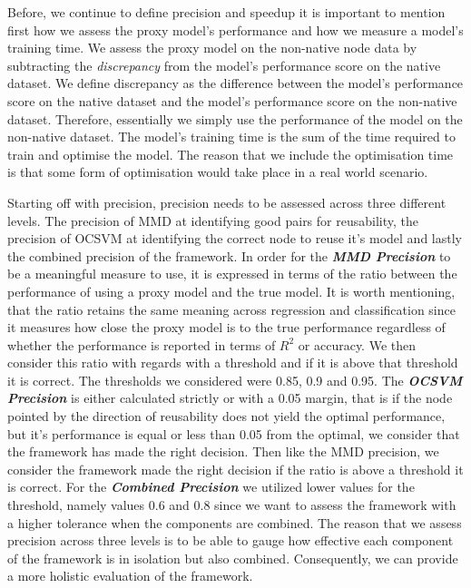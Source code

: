 \documentclass{mpaper}
\begin{document}
Before, we continue to define precision and speedup it is important to mention first how we assess the proxy model's performance and how we measure a model's training time. We assess the proxy model on the non-native node data by subtracting the \textit{discrepancy} from the model's performance score on the native dataset. We define discrepancy as the difference between the model's performance score on the native dataset and the model's performance score on the non-native dataset. Therefore, essentially we simply use the performance of the model on the non-native dataset. The model's training time is the sum of the time required to train and optimise the model. The reason that we include the optimisation time is that some form of optimisation would take place in a real world scenario.

Starting off with precision, precision needs to be assessed across three different levels. The precision of MMD at identifying good pairs for reusability, the precision of OCSVM at identifying the correct node to reuse it's model and lastly the combined precision of the framework. In order for the \textbf{\textit{MMD Precision}} to be a meaningful measure to use, it is expressed in terms of the ratio between the performance of using a proxy model and the true model. It is worth mentioning, that the ratio retains the same meaning across regression and classification since it measures how close the proxy model is to the true performance regardless of whether the performance is reported in terms of $R^2$ or accuracy. We then consider this ratio with regards with a threshold and if it is above that threshold it is correct. The thresholds we considered were 0.85, 0.9 and 0.95. The \textbf{\textit{OCSVM Precision}} is either calculated strictly or with a 0.05 margin, that is if the node pointed by the direction of reusability does not yield the optimal performance, but it's performance is equal or less than 0.05 from the optimal, we consider that the framework has made the right decision. Then like the MMD precision, we consider the framework made the right decision if the ratio is above a threshold it is correct. For the \textbf{\textit{Combined Precision}} we utilized lower values for the threshold, namely values 0.6 and 0.8 since we want to assess the framework with a higher tolerance when the components are combined. The reason that we assess precision across three levels is to be able to gauge how effective each component of the framework is in isolation but also combined. Consequently, we can provide a more holistic evaluation of the framework. 
\end{document}
